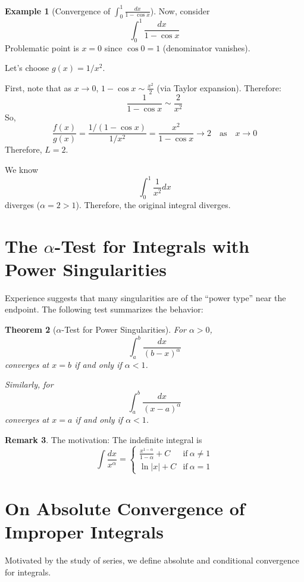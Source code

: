 \documentclass[12pt]{article}
\newtheorem{theorem}{Theorem}[section]
\theoremstyle{definition}
\newtheorem{example}[theorem]{Example}
\newtheorem{remark}[theorem]{Remark}
\begin{document}
\vspace{0.2cm}

\begin{example}[Convergence of $\int_0^1 \frac{dx}{1 - \cos x}$]
Now, consider
\[
\int_0^1 \frac{dx}{1 - \cos x}
\]
Problematic point is $x = 0$ since $\cos 0 = 1$ (denominator vanishes).

Let’s choose $g(x) = 1/x^2$.

First, note that as $x\to 0$, $1 - \cos x \sim \frac{x^2}{2}$ (via Taylor expansion). Therefore:
\[
\frac{1}{1 - \cos x} \sim \frac{2}{x^2}
\]
So,
\[
\frac{f(x)}{g(x)} = \frac{1/(1 - \cos x)}{1/x^2} = \frac{x^2}{1 - \cos x} \to 2 \quad \text{as} \quad x \to 0
\]
Therefore, $L = 2$.

We know
\[
\int_0^1 \frac{1}{x^2} dx
\]
diverges ($\alpha = 2 > 1$). Therefore, the original integral diverges.
\end{example}

\vspace{0.2cm}

\section{The \texorpdfstring{$\alpha$}{alpha}-Test for Integrals with Power Singularities}

Experience suggests that many singularities are of the ``power type'' near the endpoint. The following test summarizes the behavior:

\begin{theorem}[$\alpha$-Test for Power Singularities]
For $\alpha > 0$,
\[
\int_a^b \frac{dx}{(b - x)^\alpha}
\]
converges at $x = b$ if and only if $\alpha < 1$.

Similarly, for
\[
\int_a^b \frac{dx}{(x - a)^\alpha}
\]
converges at $x = a$ if and only if $\alpha < 1$.
\end{theorem}

\begin{remark}
The motivation: The indefinite integral is
\[
\int \frac{dx}{x^\alpha} =
\begin{cases}
\frac{x^{1-\alpha}}{1-\alpha} + C & \text{if}~ \alpha \neq 1 \\
\ln |x| + C & \text{if}~ \alpha = 1
\end{cases}
\]
\end{remark}

\section{On Absolute Convergence of Improper Integrals}
Motivated by the study of series, we define absolute and conditional convergence for integrals.
\end{document}
